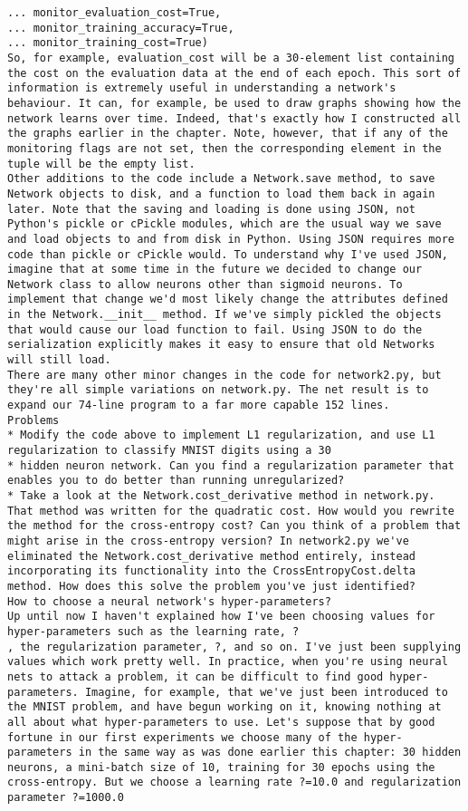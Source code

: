 \begin{lstlisting}
... monitor_evaluation_cost=True,
... monitor_training_accuracy=True,
... monitor_training_cost=True)
So, for example, evaluation_cost will be a 30-element list containing the cost on the evaluation data at the end of each epoch. This sort of information is extremely useful in understanding a network's behaviour. It can, for example, be used to draw graphs showing how the network learns over time. Indeed, that's exactly how I constructed all the graphs earlier in the chapter. Note, however, that if any of the monitoring flags are not set, then the corresponding element in the tuple will be the empty list.
Other additions to the code include a Network.save method, to save Network objects to disk, and a function to load them back in again later. Note that the saving and loading is done using JSON, not Python's pickle or cPickle modules, which are the usual way we save and load objects to and from disk in Python. Using JSON requires more code than pickle or cPickle would. To understand why I've used JSON, imagine that at some time in the future we decided to change our Network class to allow neurons other than sigmoid neurons. To implement that change we'd most likely change the attributes defined in the Network.__init__ method. If we've simply pickled the objects that would cause our load function to fail. Using JSON to do the serialization explicitly makes it easy to ensure that old Networks will still load.
There are many other minor changes in the code for network2.py, but they're all simple variations on network.py. The net result is to expand our 74-line program to a far more capable 152 lines.
Problems
* Modify the code above to implement L1 regularization, and use L1 regularization to classify MNIST digits using a 30
* hidden neuron network. Can you find a regularization parameter that enables you to do better than running unregularized?
* Take a look at the Network.cost_derivative method in network.py. That method was written for the quadratic cost. How would you rewrite the method for the cross-entropy cost? Can you think of a problem that might arise in the cross-entropy version? In network2.py we've eliminated the Network.cost_derivative method entirely, instead incorporating its functionality into the CrossEntropyCost.delta method. How does this solve the problem you've just identified?
How to choose a neural network's hyper-parameters?
Up until now I haven't explained how I've been choosing values for hyper-parameters such as the learning rate, ?
, the regularization parameter, ?, and so on. I've just been supplying values which work pretty well. In practice, when you're using neural nets to attack a problem, it can be difficult to find good hyper-parameters. Imagine, for example, that we've just been introduced to the MNIST problem, and have begun working on it, knowing nothing at all about what hyper-parameters to use. Let's suppose that by good fortune in our first experiments we choose many of the hyper-parameters in the same way as was done earlier this chapter: 30 hidden neurons, a mini-batch size of 10, training for 30 epochs using the cross-entropy. But we choose a learning rate ?=10.0 and regularization parameter ?=1000.0

\end{lstlisting}
